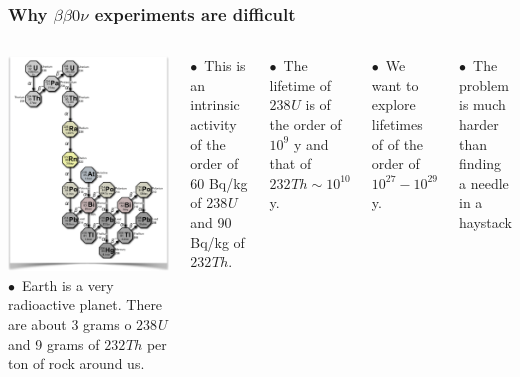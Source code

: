 \begin{frame}
\frametitle{Why $\beta\beta0\nu$ experiments are difficult}
\begin{columns}
\includegraphics[scale=0.35]{img/Uchain.png}
$\bullet$~Earth is a very radioactive planet. There are about 3 grams o ${238}^{}U$ and 9 grams of ${232}^{}Th$ per ton of rock around us.

$\bullet$~This is an intrinsic activity of the order of 60 Bq/kg of ${238}^{}U$ and  90 Bq/kg of ${232}^{}Th$.

$\bullet$~The lifetime of ${238}^{}U$ is of the order of $10^9$ y and that of ${232}^{}Th \sim 10^{10}$ y. 

$\bullet$~We want to explore lifetimes of of the order of $10^{27} -10^{29}$ y.

$\bullet$~The problem is much harder than finding a needle in a haystack 
\end{columns}
\end{frame}

